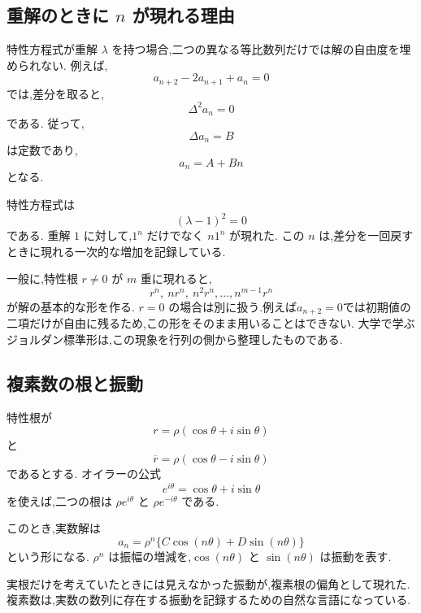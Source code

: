 \subsection{重解のときに $n$ が現れる理由}

特性方程式が重解 $\lambda$ を持つ場合,二つの異なる等比数列だけでは解の自由度を埋められない.
例えば,
\[
  a_{n+2}-2a_{n+1}+a_n=0
\]
では,差分を取ると,
\[
  \Delta^2a_n=0
\]
である.
従って,
\[
  \Delta a_n=B
\]
は定数であり,
\[
  a_n=A+Bn
\]
となる.

特性方程式は
\[
  (\lambda-1)^2=0
\]
である.
重解 $1$ に対して,$1^n$ だけでなく $n1^n$ が現れた.
この $n$ は,差分を一回戻すときに現れる一次的な増加を記録している.

一般に,特性根 $r\ne0$ が $m$ 重に現れると,
\[
  r^n,\ nr^n,\ n^2r^n,\ldots,n^{m-1}r^n
\]
が解の基本的な形を作る.
$r=0$ の場合は別に扱う.例えば$a_{n+2}=0$では初期値の二項だけが自由に残るため,この形をそのまま用いることはできない.
大学で学ぶジョルダン標準形は,この現象を行列の側から整理したものである.

\subsection{複素数の根と振動}

特性根が
\[
  r=\rho(\cos\theta+i\sin\theta)
\]
と
\[
  \overline r=\rho(\cos\theta-i\sin\theta)
\]
であるとする.
オイラーの公式
\[
  e^{i\theta}=\cos\theta+i\sin\theta
\]
を使えば,二つの根は $\rho e^{i\theta}$ と $\rho e^{-i\theta}$ である.

このとき,実数解は
\[
  a_n=\rho^n\{C\cos(n\theta)+D\sin(n\theta)\}
\]
という形になる.
$\rho^n$ は振幅の増減を,$\cos(n\theta)$ と $\sin(n\theta)$ は振動を表す.

実根だけを考えていたときには見えなかった振動が,複素根の偏角として現れた.
複素数は,実数の数列に存在する振動を記録するための自然な言語になっている.
